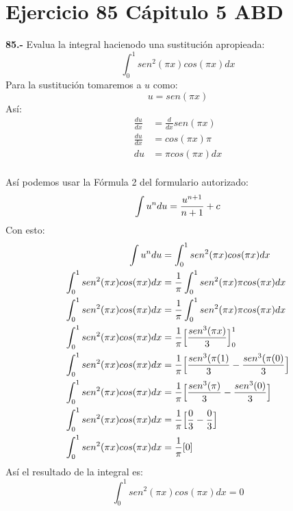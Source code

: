 \chapter*{Ejercicio 85 Cápitulo 5 ABD }

\textbf{85.-} Evalua la integral hacienodo una sustitución apropieada:
\[
\int_{0}^{1} sen^{2}(\pi x)cos(\pi x) dx
\]
Para la sustitución tomaremos a $u$ como:
\[
u = sen(\pi x)
\]
Así:
\begin{align*}
    \frac{du}{dx} &= \frac{d}{dx}sen(\pi x) \\
    \frac{du}{dx} &= cos(\pi x) \pi \\
    du &= \pi cos(\pi x)  dx \\
\end{align*}

Así podemos usar la Fórmula 2 del formulario autorizado:
\[
\int u^{n}du = \frac{u^{n+1}}{n+1} +c \\
\]
Con esto:
\begin{align*}
    \int u^{n}du &= \int_{0}^{1} sen^{2}(\pi x)cos(\pi x) dx \\
    \int_{0}^{1} sen^{2}(\pi x)cos(\pi x) dx &= \frac{1}{\pi} \int_{0}^{1} sen^{2}(\pi x)\pi cos(\pi x) dx \\
    \int_{0}^{1} sen^{2}(\pi x)cos(\pi x) dx &= \frac{1}{\pi} \int_{0}^{1} sen^{2}(\pi x)\pi cos(\pi x) dx \\
    \int_{0}^{1} sen^{2}(\pi x)cos(\pi x) dx &= \frac{1}{\pi} \Bigl[\frac{sen^{3}(\pi x)}{3}\Bigr]_{0}^{1} \\
    \int_{0}^{1} sen^{2}(\pi x)cos(\pi x) dx &= \frac{1}{\pi} \Bigl[\frac{sen^{3}(\pi (1)}{3} - \frac{sen^{3}(\pi (0)}{3}\Bigr]\\
    \int_{0}^{1} sen^{2}(\pi x)cos(\pi x) dx &= \frac{1}{\pi} \Bigl[\frac{sen^{3}(\pi)}{3} - \frac{sen^{3}(0)}{3}\Bigr]\\
    \int_{0}^{1} sen^{2}(\pi x)cos(\pi x) dx &= \frac{1}{\pi} \Bigl[\frac{0}{3} - \frac{0}{3}\Bigr]\\
    \int_{0}^{1} sen^{2}(\pi x)cos(\pi x) dx &= \frac{1}{\pi} [0]\\
\end{align*}
Así el resultado de la integral es:
\[
\int_{0}^{1} sen^{2}(\pi x)cos(\pi x) dx = 0
\]